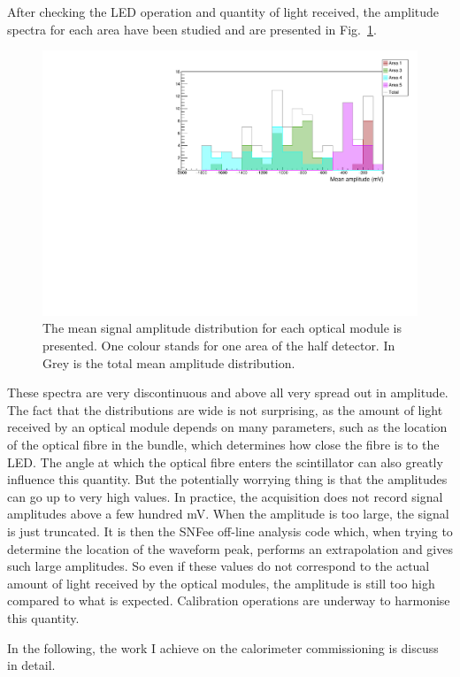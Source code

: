 After checking the LED operation and quantity of light received, the amplitude spectra for each area have been studied and are presented in Fig.~\ref{fig:LI_ampl}.
\begin{figure}[h]
  \centering
  \includegraphics[width=15cm]{commissioning/fig_commissioning/LI_mean_ampl.pdf}
  \caption{The mean signal amplitude distribution for each optical module is presented.
    One colour stands for one area of the half detector.
    In Grey is the total mean amplitude distribution.
    \label{fig:LI_ampl}}
\end{figure}
These spectra are very discontinuous and above all very spread out in amplitude.
The fact that the distributions are wide is not surprising, as the amount of light received by an optical module depends on many parameters, such as the location of the optical fibre in the bundle, which determines how close the fibre is to the LED.
The angle at which the optical fibre enters the scintillator can also greatly influence this quantity.
But the potentially worrying thing is that the amplitudes can go up to very high values.
In practice, the acquisition does not record signal amplitudes above a few hundred mV.
When the amplitude is too large, the signal is just truncated.
It is then the SNFee off-line analysis code which, when trying to determine the location of the waveform peak, performs an extrapolation and gives such large amplitudes.
So even if these values do not correspond to the actual amount of light received by the optical modules, the amplitude is still too high compared to what is expected.
Calibration operations are underway to harmonise this quantity.

In the following, the work I achieve on the calorimeter commissioning is discuss in detail.


